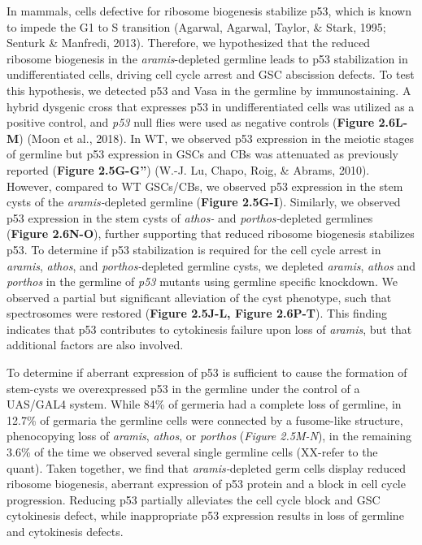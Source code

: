 \documentclass[12pt,oneside]{reedthesis}
\begin{document}
In mammals, cells defective for ribosome biogenesis stabilize p53, which
is known to impede the G1 to S transition (Agarwal, Agarwal, Taylor, \& Stark, 1995; Senturk \& Manfredi, 2013). Therefore, we hypothesized that the reduced
ribosome biogenesis in the \emph{aramis}-depleted germline leads to p53
stabilization in undifferentiated cells, driving cell cycle arrest and
GSC abscission defects. To test this hypothesis, we detected p53 and
Vasa in the germline by immunostaining. A hybrid dysgenic cross that
expresses p53 in undifferentiated cells was utilized as a positive
control, and \emph{p53} null flies were used as negative controls (\textbf{Figure 2.6L-M}) (Moon et al., 2018). In WT, we observed p53 expression in the
meiotic stages of germline but p53 expression in GSCs and CBs was
attenuated as previously reported (\textbf{Figure 2.5G-G''})
(W.-J. Lu, Chapo, Roig, \& Abrams, 2010). However, compared to WT
GSCs/CBs, we observed p53 expression in the stem cysts of the
\emph{aramis-}depleted germline (\textbf{Figure 2.5G-I}). Similarly, we observed p53
expression in the stem cysts of \emph{athos-} and \emph{porthos-}depleted
germlines (\textbf{Figure 2.6N-O}), further supporting that reduced ribosome
biogenesis stabilizes p53. To determine if p53 stabilization is required
for the cell cycle arrest in \emph{aramis}, \emph{athos}, and \emph{porthos-}depleted
germline cysts, we depleted \emph{aramis}, \emph{athos} and \emph{porthos} in the
germline of \emph{p53} mutants using germline specific knockdown. We observed
a partial but significant alleviation of the cyst phenotype, such that
spectrosomes were restored (\textbf{Figure 2.5J-L, Figure 2.6P-T}). This finding
indicates that p53 contributes to cytokinesis failure upon loss of
\emph{aramis}, but that additional factors are also involved.

To determine if aberrant expression of p53 is sufficient to cause the
formation of stem-cysts we overexpressed p53 in the germline under the
control of a UAS/GAL4 system. While 84\% of germeria had a complete loss
of germline, in 12.7\% of germaria the germline cells were connected by a
fusome-like structure, phenocopying loss of \emph{aramis}, \emph{athos}, or
\emph{porthos} (\emph{Figure 2.5M-N}), in the remaining 3.6\% of the time we observed
several single germline cells (XX-refer to the quant). Taken together,
we find that \emph{aramis-}depleted germ cells display reduced ribosome
biogenesis, aberrant expression of p53 protein and a block in cell cycle
progression. Reducing p53 partially alleviates the cell cycle block and
GSC cytokinesis defect, while inappropriate p53 expression results in
loss of germline and cytokinesis defects.
\end{document}
